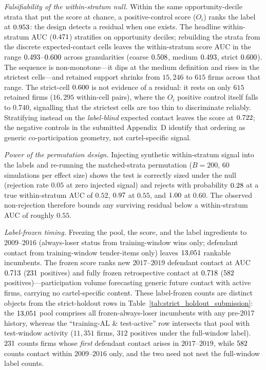 \emph{Falsifiability of the within-stratum null.} Within the same
opportunity-decile strata that put the score at chance, a
positive-control score ($O_i$) ranks the label at
$0.953$: the design detects a residual when one
exists. The headline within-stratum AUC ($0.471$) stratifies
on opportunity deciles; rebuilding the strata from the discrete
expected-contact cells leaves the within-stratum score AUC in the range
$0.493$--$0.600$ across granularities
(coarse $0.508$, medium $0.493$, strict
$0.600$). The sequence is non-monotone---it dips at the
medium definition and rises in the strictest cells---and retained
support shrinks from $15{,}246$ to $615$ firms across that range. The
strict-cell $0.600$ is not evidence of a residual: it
rests on only $615$ retained firms ($16{,}295$ within-cell pairs), where
the $O_i$ positive control itself falls to $0.740$, signalling that the
strictest cells are too thin to discriminate reliably. Stratifying
instead on the \emph{label-blind} expected contact leaves the score at
$0.722$; the negative controls in the submitted
Appendix~D identify that ordering as generic co-participation geometry,
not cartel-specific signal.

\emph{Power of the permutation design.} Injecting synthetic
within-stratum signal into the labels and re-running the matched-strata
permutation ($B=200$, $60$ simulations per effect size) shows the test
is correctly sized under the null (rejection rate $0.05$ at zero
injected signal) and rejects with probability $0.28$ at a
true within-stratum AUC of $0.52$, $0.97$ at $0.55$, and
$1.00$ at $0.60$. The observed non-rejection therefore
bounds any surviving residual below a within-stratum AUC of roughly
$0.55$.

\emph{Label-frozen timing.} Freezing the pool, the score, and the label
ingredients to $2009$--$2016$ (always-loser status from training-window
wins only; defendant contact from training-window tender-items only)
leaves $13{,}051$ rankable incumbents. The frozen score ranks
new $2017$--$2019$ defendant contact at AUC $0.713$
($231$ positives) and fully frozen retrospective
contact at $0.718$ ($582$
positives)---participation volume forecasting generic future contact
with active firms, carrying no cartel-specific content. These
label-frozen counts are distinct objects from the strict-holdout rows in
Table~\ref{tab:strict_holdout_submission}: the $13{,}051$
pool comprises all frozen-always-loser incumbents with any pre-2017
history, whereas the ``training-AL \& test-active'' row intersects that
pool with test-window activity ($11{,}351$ firms, $312$ positives under
the full-window label). $231$ counts firms whose
\emph{first} defendant contact arises in $2017$--$2019$, while
$582$ counts contact within $2009$--$2016$ only, and
the two need not nest the full-window label counts.

